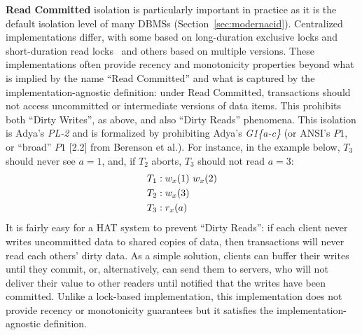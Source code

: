\textbf{Read Committed} isolation is particularly important in
practice as it is the default isolation level of many DBMSs
(Section~\ref{sec:modernacid}). Centralized implementations differ,
with some based on long-duration exclusive locks and short-duration
read locks~\cite{gray-isolation} and others based on multiple
versions. These implementations often provide recency and monotonicity
properties beyond what is implied by the name ``Read Committed'' and
what is captured by the implementation-agnostic definition: under Read
Committed, transactions should not access uncommitted or intermediate
versions of data items. This prohibits both ``Dirty Writes'', as
above, and also ``Dirty Reads'' phenomena.  This isolation is Adya's
\textit{PL-2} and is formalized by prohibiting Adya's
\textit{G1\{a-c\}} (or ANSI's $P1$, or ``broad'' $P1$ [2.2] from
Berenson et al.). For instance, in the example below, $T_3$ should
never see $a=1$, and, if $T_2$ aborts, $T_3$ should not read $a=3$:
\begin{align*}
\small\vspace{-1em}
T_1 &: w_x(1)~w_x(2)
\\T_2 &: w_x(3)\\
T_3 &: r_x(a)\vspace{-1em}
\end{align*}
It is fairly easy for a HAT system to prevent ``Dirty Reads'': if each
client never writes uncommitted data to shared copies of data, then
transactions will never read each others' dirty data. As a simple
solution, clients can buffer their writes until they commit, or,
alternatively, can send them to servers, who will not deliver their
value to other readers until notified that the writes have been
committed. Unlike a lock-based implementation, this implementation
does not provide recency or monotonicity guarantees but it satisfies
the implementation-agnostic definition.

